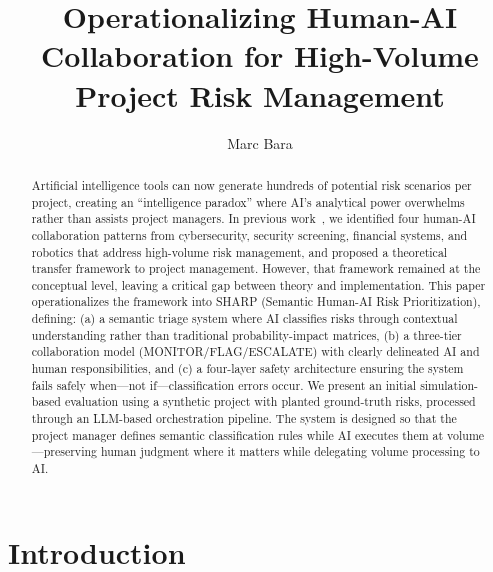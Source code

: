 \documentclass[runningheads]{llncs}
\begin{document}
%
\title{Operationalizing Human-AI Collaboration for High-Volume Project Risk Management}
%
%
\author{Marc Bara}
%
\maketitle
%

\begin{abstract}
Artificial intelligence tools can now generate hundreds of potential risk scenarios per project, creating an ``intelligence paradox'' where AI's analytical power overwhelms rather than assists project managers. In previous work~\cite{bara2025catania}, we identified four human-AI collaboration patterns from cybersecurity, security screening, financial systems, and robotics that address high-volume risk management, and proposed a theoretical transfer framework to project management. However, that framework remained at the conceptual level, leaving a critical gap between theory and implementation. This paper operationalizes the framework into SHARP (Semantic Human-AI Risk Prioritization), defining: (a) a semantic triage system where AI classifies risks through contextual understanding rather than traditional probability-impact matrices, (b) a three-tier collaboration model (MONITOR/FLAG/ESCALATE) with clearly delineated AI and human responsibilities, and (c) a four-layer safety architecture ensuring the system fails safely when---not if---classification errors occur. We present an initial simulation-based evaluation using a synthetic project with planted ground-truth risks, processed through an LLM-based orchestration pipeline. The system is designed so that the project manager defines semantic classification rules while AI executes them at volume---preserving human judgment where it matters while delegating volume processing to AI.

\end{abstract}

\section{Introduction}
\end{document}
